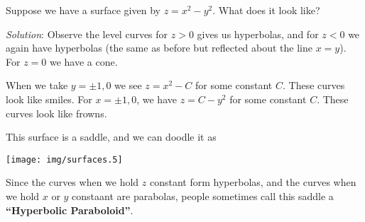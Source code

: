 \begin{example}
Suppose we have a surface given by $z=x^{2}-y^{2}$. What does it
look like?

\emph{Solution}: Observe the level curves for $z>0$ gives us
hyperbolas, and for $z<0$ we again have hyperbolas (the same as
before but reflected about the line $x=y$). For $z=0$ we have a
cone. 

When we take $y=\pm1,0$ we see $z=x^{2}-C$ for some constant
$C$. These curves look like smiles. For $x=\pm1,0$, we have
$z=C-y^{2}$ for some constant $C$. These curves look like
frowns. 

This surface is a saddle, and we can doodle it as
\begin{center}
\texttt{[image: img/surfaces.5]}
\end{center}
Since the curves when we hold $z$ constant form hyperbolas, and
the curves when we hold $x$ or $y$ constaant are parabolas,
people sometimes call this saddle a \textbf{``Hyperbolic Paraboloid''}.
\end{example}
